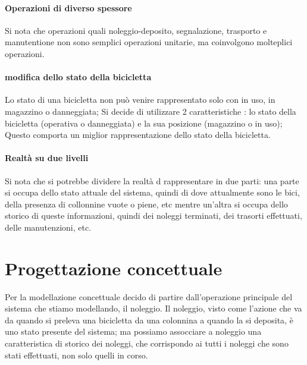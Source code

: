 \documentclass[a4paper,twoside]{article}
\begin{document}
\paragraph{Operazioni di diverso spessore} Si nota che operazioni quali noleggio-deposito, segnalazione, trasporto e manutentione non sono semplici operazioni unitarie, ma coinvolgono molteplici operazioni.
\paragraph{modifica dello stato della bicicletta} Lo stato di una bicicletta non può venire rappresentato solo con in uso, in magazzino o danneggiata; Si decide di utilizzare 2 caratteristiche : lo stato della bicicletta (operativa o danneggiata) e la sua posizione (magazzino o in uso); Questo comporta un miglior rappresentazione dello stato della bicicletta.
\paragraph{Realtà su due livelli} Si nota che si potrebbe dividere la realtà d rappresentare in due parti: una parte si occupa dello stato attuale del sistema, quindi di dove attualmente sono le bici, della presenza di collonnine vuote o piene, etc mentre un'altra si occupa dello storico di queste informazioni, quindi dei noleggi terminati, dei trasorti effettuati, delle manutenzioni, etc.

\section{Progettazione concettuale}
Per la modellazione concettuale decido di partire dall'operazione principale del sistema che stiamo modellando, il noleggio.
Il noleggio, visto come l'azione che va da quando si preleva una bicicletta da una colonnina a quando la si deposita, è uno stato presente del sistema; ma possiamo assocciare a noleggio una caratteristica di storico dei noleggi, che corrispondo ai tutti i noleggi che sono stati effettuati, non solo quelli in corso.
\end{document}
